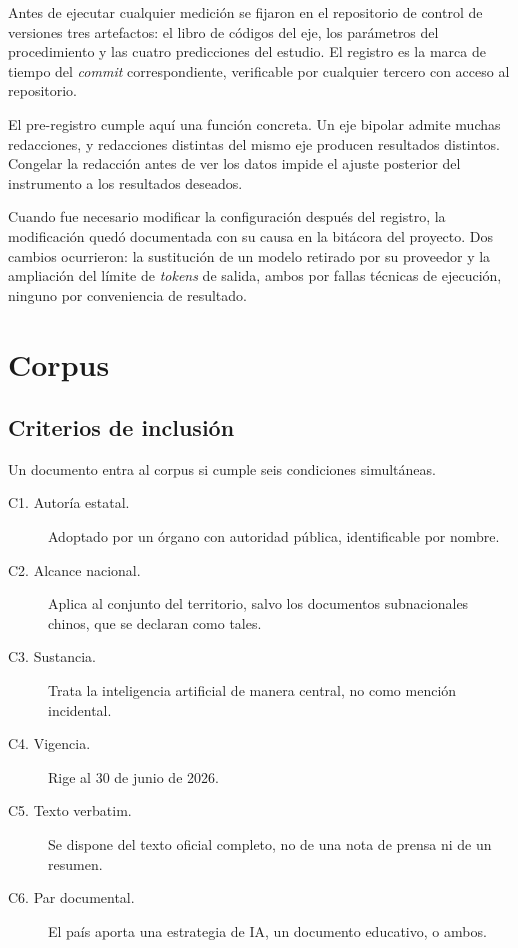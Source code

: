 Antes de ejecutar cualquier medición se fijaron en el repositorio de control de versiones tres artefactos: el libro de códigos del eje, los parámetros del procedimiento y las cuatro predicciones del estudio. El registro es la marca de tiempo del \textit{commit} correspondiente, verificable por cualquier tercero con acceso al repositorio.

El pre-registro cumple aquí una función concreta. Un eje bipolar admite muchas redacciones, y redacciones distintas del mismo eje producen resultados distintos. Congelar la redacción antes de ver los datos impide el ajuste posterior del instrumento a los resultados deseados.

Cuando fue necesario modificar la configuración después del registro, la modificación quedó documentada con su causa en la bitácora del proyecto. Dos cambios ocurrieron: la sustitución de un modelo retirado por su proveedor y la ampliación del límite de \textit{tokens} de salida, ambos por fallas técnicas de ejecución, ninguno por conveniencia de resultado.

\section{Corpus}

\subsection{Criterios de inclusión}

Un documento entra al corpus si cumple seis condiciones simultáneas.

\begin{description}
    \item[C1. Autoría estatal.] Adoptado por un órgano con autoridad pública, identificable por nombre.
    \item[C2. Alcance nacional.] Aplica al conjunto del territorio, salvo los documentos subnacionales chinos, que se declaran como tales.
    \item[C3. Sustancia.] Trata la inteligencia artificial de manera central, no como mención incidental.
    \item[C4. Vigencia.] Rige al 30 de junio de 2026.
    \item[C5. Texto verbatim.] Se dispone del texto oficial completo, no de una nota de prensa ni de un resumen.
    \item[C6. Par documental.] El país aporta una estrategia de IA, un documento educativo, o ambos.
\end{description}

